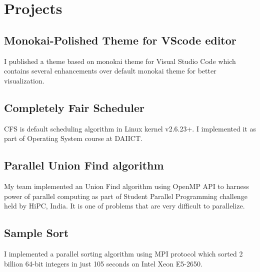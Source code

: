 \documentclass[]{deedy-resume-openfont}
\begin{document}
\hfill
\begin{minipage}[t]{0.66\textwidth} 


\section{Projects}

\subsection{Monokai-Polished Theme for VScode editor}
I published a theme based on monokai theme for Visual Studio Code which contains several enhancements over default monokai theme for better visualization.
\sectionsep

\subsection{Completely Fair Scheduler}
CFS is default scheduling algorithm in Linux kernel v2.6.23+. I implemented it as part of
Operating System course at DAIICT.
\sectionsep

\subsection{Parallel Union Find algorithm}
My team implemented an Union Find algorithm using OpenMP API to harness power
of parallel computing as part of Student Parallel Programming challenge held by HiPC,
India. It is one of problems that are very difficult to parallelize.
\sectionsep

\subsection{Sample Sort}
I implemented a parallel sorting algorithm using MPI protocol which sorted 2 billion
64-bit integers in just 105 seconds on Intel Xeon E5-2650.
\sectionsep


\end{minipage}
\end{document}
